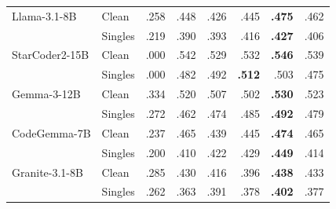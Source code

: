 \begin{table}[!t]
\begin{tabular}{@{}llrrrrrr@{}}
\addlinespace[2pt]

Llama-3.1-8B
& Clean
& .258
& \textcolor{green!55!black}{.448}
& \textcolor{green!55!black}{.426}
& \textcolor{green!55!black}{.445}
& \textbf{\textcolor{green!55!black}{.475}}
& \textcolor{green!55!black}{.462} \\
& Singles
& .219
& \textcolor{green!55!black}{.390}
& \textcolor{green!55!black}{.393}
& \textcolor{green!55!black}{.416}
& \textbf{\textcolor{green!55!black}{.427}}
& \textcolor{green!55!black}{.406} \\

\addlinespace[2pt]

StarCoder2-15B
& Clean
& .000
& \textcolor{green!55!black}{.542}
& \textcolor{green!55!black}{.529}
& \textcolor{green!55!black}{.532}
& \textbf{\textcolor{green!55!black}{.546}}
& \textcolor{green!55!black}{.539} \\
& Singles
& .000
& \textcolor{green!55!black}{.482}
& \textcolor{green!55!black}{.492}
& \textbf{\textcolor{green!55!black}{.512}}
& \textcolor{green!55!black}{.503}
& \textcolor{green!55!black}{.475} \\

\addlinespace[2pt]

Gemma-3-12B
& Clean
& .334
& \textcolor{green!55!black}{.520}
& \textcolor{green!55!black}{.507}
& \textcolor{green!55!black}{.502}
& \textbf{\textcolor{green!55!black}{.530}}
& \textcolor{green!55!black}{.523} \\
& Singles
& .272
& \textcolor{green!55!black}{.462}
& \textcolor{green!55!black}{.474}
& \textcolor{green!55!black}{.485}
& \textbf{\textcolor{green!55!black}{.492}}
& \textcolor{green!55!black}{.479} \\

\addlinespace[2pt]

CodeGemma-7B
& Clean
& .237
& \textcolor{green!55!black}{.465}
& \textcolor{green!55!black}{.439}
& \textcolor{green!55!black}{.445}
& \textbf{\textcolor{green!55!black}{.474}}
& \textcolor{green!55!black}{.465} \\
& Singles
& .200
& \textcolor{green!55!black}{.410}
& \textcolor{green!55!black}{.422}
& \textcolor{green!55!black}{.429}
& \textbf{\textcolor{green!55!black}{.449}}
& \textcolor{green!55!black}{.414} \\

\addlinespace[2pt]

Granite-3.1-8B
& Clean
& .285
& \textcolor{green!55!black}{.430}
& \textcolor{green!55!black}{.416}
& \textcolor{green!55!black}{.396}
& \textbf{\textcolor{green!55!black}{.438}}
& \textcolor{green!55!black}{.433} \\
& Singles
& .262
& \textcolor{green!55!black}{.363}
& \textcolor{green!55!black}{.391}
& \textcolor{green!55!black}{.378}
& \textbf{\textcolor{green!55!black}{.402}}
& \textcolor{green!55!black}{.377} \\

\bottomrule
\end{tabular}
\end{table}

